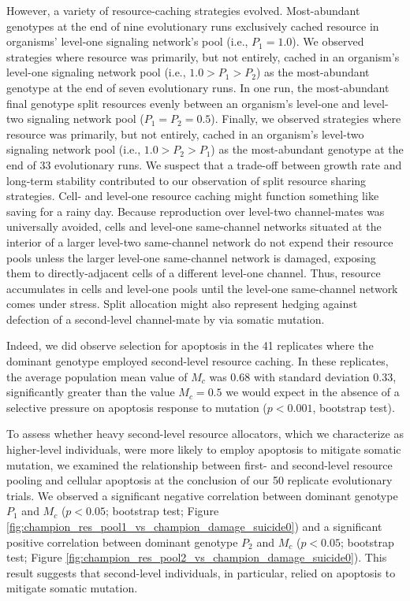 However, a variety of resource-caching strategies evolved.
Most-abundant genotypes at the end of nine evolutionary runs exclusively cached resource in organisms' level-one signaling network's pool (i.e., $P_1 = 1.0$).
We observed strategies where resource was primarily, but not entirely, cached in an organism's level-one signaling network pool (i.e., $1.0 > P_1 > P_2$) as the most-abundant genotype at the end of seven evolutionary runs.
In one run, the most-abundant final genotype split resources evenly between an organism's level-one and level-two signaling network pool ($P_1 = P_2 = 0.5$).
Finally, we observed strategies where resource was primarily, but not entirely, cached in an organism's level-two signaling network pool (i.e., $1.0 > P_2 > P_1$) as the most-abundant genotype at the end of 33 evolutionary runs.
We suspect that a trade-off between growth rate and long-term stability contributed to our observation of split resource sharing strategies.
Cell- and level-one resource caching might function something like saving for a rainy day.
Because reproduction over level-two channel-mates was universally avoided, cells and level-one same-channel networks situated at the interior of a larger level-two same-channel network do not expend their resource pools unless the larger level-one same-channel network is damaged, exposing them to directly-adjacent cells of a different level-one channel.
Thus, resource accumulates in cells and level-one pools until the level-one same-channel network comes under stress.
Split allocation might also represent hedging against defection of a second-level channel-mate by via somatic mutation.

Indeed, we did observe selection for apoptosis in the 41 replicates where the dominant genotype employed second-level resource caching.
In these replicates, the average population mean value of $M_{c}$ was 0.68 with standard deviation 0.33, significantly greater than the value $M_{c} = 0.5$ we would expect in the absence of a selective pressure on apoptosis response to mutation ($p < 0.001$, bootstrap test).



To assess whether heavy second-level resource allocators, which we characterize as higher-level individuals, were more likely to employ apoptosis to mitigate somatic mutation, we examined the relationship between first- and second-level resource pooling and cellular apoptosis at the conclusion of our 50 replicate evolutionary trials.
We observed a significant negative correlation between dominant genotype $P_1$ and $M_{c}$ ($p < 0.05$; bootstrap test; Figure \ref{fig:champion_res_pool1_vs_champion_damage_suicide0}) and a significant positive correlation between dominant genotype $P_2$ and $M_{c}$ ($p < 0.05$; bootstrap test; Figure \ref{fig:champion_res_pool2_vs_champion_damage_suicide0}).
This result suggests that second-level individuals, in particular, relied on apoptosis to mitigate somatic mutation.


